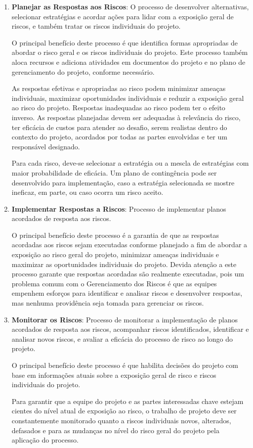 \documentclass[
	12pt,
	openright,
	twoside,
	a4paper,
	english,
	brazil
	]{abntex2}
\begin{document}
\begin{enumerate}
  \item \textbf{Planejar as Respostas aos Riscos}: O processo de desenvolver alternativas, selecionar estratégias e acordar ações para lidar com a exposição geral de riscos, e também tratar os riscos individuais do projeto.  
  
  O principal benefício deste processo é que identifica formas apropriadas de abordar o risco geral e os riscos individuais do projeto. Este processo também aloca recursos e adiciona atividades em documentos do projeto e no plano de gerenciamento do projeto, conforme necessário.  
  
  As respostas efetivas e apropriadas ao risco podem minimizar ameaças individuais, maximizar oportunidades individuais e reduzir a exposição geral ao risco do projeto. Respostas inadequadas ao risco podem ter o efeito inverso. As respostas planejadas devem ser adequadas à relevância do risco, ter eficácia de custos para atender ao desafio, serem realistas dentro do contexto do projeto, acordados por todas as partes envolvidas e ter um responsável designado.  
  
  Para cada risco, deve-se selecionar a estratégia ou a mescla de estratégias com maior probabilidade de eficácia. Um plano de contingência pode ser desenvolvido para implementação, caso a estratégia selecionada se mostre ineficaz, em parte, ou caso ocorra um risco aceito.

  \item \textbf{Implementar Respostas a Riscos}: Processo de implementar planos acordados de resposta aos riscos.  
  
  O principal benefício deste processo é a garantia de que as respostas acordadas aos riscos sejam executadas conforme planejado a fim de abordar a exposição ao risco geral do projeto, minimizar ameaças individuais e maximizar as oportunidades individuais do projeto. Devida atenção a este processo garante que respostas acordadas são realmente executadas, pois um problema comum com o Gerenciamento dos Riscos é que as equipes empenhem esforços para identificar e analisar riscos e desenvolver respostas, mas nenhuma providência seja tomada para gerenciar os riscos.

  \item \textbf{Monitorar os Riscos}: Processo de monitorar a implementação de planos acordados de resposta aos riscos, acompanhar riscos identificados, identificar e analisar novos riscos, e avaliar a eficácia do processo de risco ao longo do projeto.  
  
  O principal benefício deste processo é que habilita decisões do projeto com base em informações atuais sobre a exposição geral de risco e riscos individuais do projeto.  
  
  Para garantir que a equipe do projeto e as partes interessadas chave estejam cientes do nível atual de exposição ao risco, o trabalho de projeto deve ser constantemente monitorado quanto a riscos individuais novos, alterados, defasados e para as mudanças no nível do risco geral do projeto pela aplicação do processo.
\end{enumerate}
\end{document}
